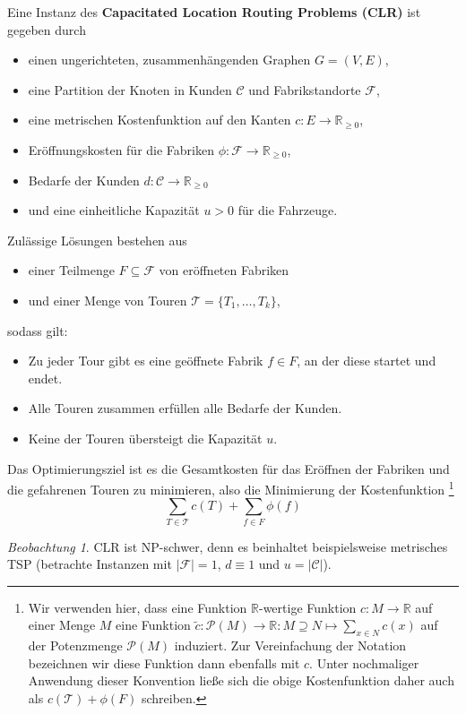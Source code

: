 \documentclass[a4paper,ngerman,11pt,bibtotoc]{scrartcl}
\theoremstyle{definition}
\theoremstyle{plain}
\theoremstyle{remark}
\newtheorem{beob}[defn]{Beobachtung}
\newcommand{\IR}{\mathbb{R}}
\newcommand{\Tc}{\mathcal{T}}
\newcommand{\ClientSet}{\mathscr{C}}
\newcommand{\FacilitySet}{\mathscr{F}}
\newcommand{\CLR}{\mathrm{CLR}}
\begin{document}
Eine Instanz des \textbf{Capacitated Location Routing Problems (CLR)} ist gegeben durch
\begin{itemize}
	\item einen ungerichteten, zusammenhängenden Graphen $G =(V,E)$,
	\item eine Partition der Knoten in Kunden $\ClientSet$ und Fabrikstandorte $\FacilitySet$,
	\item eine metrischen Kostenfunktion auf den Kanten $c: E \to \IR_{\geq 0}$,
	\item Eröffnungskosten für die Fabriken $\phi: \FacilitySet \to \IR_{\geq 0}$,
	\item Bedarfe der Kunden $d: \ClientSet \to \IR_{\geq 0}$
	\item und eine einheitliche Kapazität $u > 0$ für die Fahrzeuge.		
\end{itemize}
Zulässige Lösungen bestehen aus
\begin{itemize}
	\item einer Teilmenge $F \subseteq \FacilitySet$ von eröffneten Fabriken
	\item und einer Menge von Touren $\Tc = \{T_1, \dots, T_k\}$,
\end{itemize}
sodass gilt:
\begin{itemize}
	\item Zu jeder Tour gibt es eine geöffnete Fabrik $f \in F$, an der diese startet und endet.
	\item Alle Touren zusammen erfüllen alle Bedarfe der Kunden.
	\item Keine der Touren übersteigt die Kapazität $u$.
\end{itemize}
Das Optimierungsziel ist es die Gesamtkosten für das Eröffnen der Fabriken und die gefahrenen Touren zu minimieren, also die Minimierung der Kostenfunktion
\footnote{Wir verwenden hier, dass eine Funktion $\IR$-wertige Funktion $c: M \to \IR$ auf einer Menge $M$ eine Funktion $\tilde{c}: \mathcal{P}(M) \to \IR: M \supseteq N \mapsto \sum_{x \in N} c(x)$ auf der Potenzmenge $\mathcal{P}(M)$ induziert. Zur Vereinfachung der Notation bezeichnen wir diese Funktion dann ebenfalls mit $c$. Unter nochmaliger Anwendung dieser Konvention ließe sich die obige Kostenfunktion daher auch als $c(\Tc) + \phi(F)$ schreiben.}
	\[\sum_{T\in\Tc} c(T) + \sum_{f\in F}\phi(f) \]
	
\begin{beob}
	$\CLR{}$ ist NP-schwer, denn es beinhaltet beispielsweise metrisches TSP (betrachte Instanzen mit $|\FacilitySet| = 1$, $d \equiv 1$ und $u = |\ClientSet|$).
\end{beob}
\end{document}

